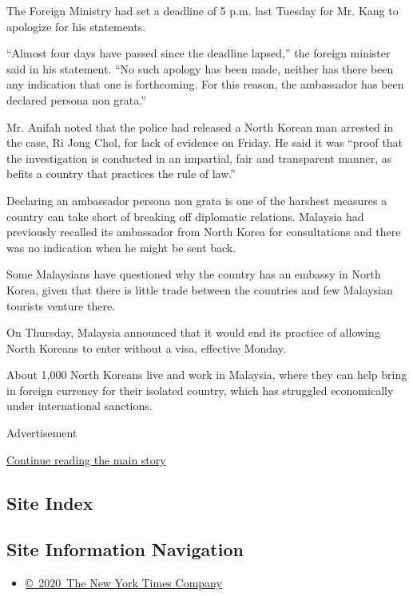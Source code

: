 The Foreign Ministry had set a deadline of 5 p.m. last Tuesday for Mr.
Kang to apologize for his statements.

``Almost four days have passed since the deadline lapsed,'' the foreign
minister said in his statement. ``No such apology has been made, neither
has there been any indication that one is forthcoming. For this reason,
the ambassador has been declared persona non grata.''

Mr. Anifah noted that the police had released a North Korean man
arrested in the case, Ri Jong Chol, for lack of evidence on Friday. He
said it was ``proof that the investigation is conducted in an impartial,
fair and transparent manner, as befits a country that practices the rule
of law.''

Declaring an ambassador persona non grata is one of the harshest
measures a country can take short of breaking off diplomatic relations.
Malaysia had previously recalled its ambassador from North Korea for
consultations and there was no indication when he might be sent back.

Some Malaysians have questioned why the country has an embassy in North
Korea, given that there is little trade between the countries and few
Malaysian tourists venture there.

On Thursday, Malaysia announced that it would end its practice of
allowing North Koreans to enter without a visa, effective Monday.

About 1,000 North Koreans live and work in Malaysia, where they can help
bring in foreign currency for their isolated country, which has
struggled economically under international sanctions.

Advertisement

\protect\hyperlink{after-bottom}{Continue reading the main story}

\hypertarget{site-index}{%
\subsection{Site Index}\label{site-index}}

\hypertarget{site-information-navigation}{%
\subsection{Site Information
Navigation}\label{site-information-navigation}}

\begin{itemize}
\tightlist
\item
  \href{https://help.nytimes.com/hc/en-us/articles/115014792127-Copyright-notice}{©~2020~The
  New York Times Company}
\end{itemize}

